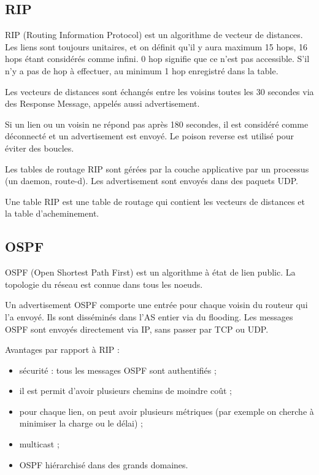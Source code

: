 	\subsection{RIP}
	
	RIP (Routing Information Protocol) est un algorithme de vecteur de distances. Les liens sont toujours unitaires, et on définit qu'il y aura maximum 15 hops, 16 hops étant considérés comme infini. 0 hop signifie que ce n'est pas accessible. S'il n'y a pas de hop à effectuer, au minimum 1 hop enregistré dans la table.
	
	
	Les vecteurs de distances sont échangés entre les voisins toutes les 30 secondes via des Response Message, appelés aussi advertisement.
	
	Si un lien ou un voisin ne répond pas après 180 secondes, il est considéré comme déconnecté et un advertisement est envoyé. Le poison reverse est utilisé pour éviter des boucles.
	
	Les tables de routage RIP sont gérées par la couche applicative par un processus (un daemon, route-d). Les advertisement sont envoyés dans des paquets UDP.
	
	
	Une table RIP est une table de routage qui contient les vecteurs de distances et la table d'acheminement.		
	
	
	\subsection{OSPF}
	
	OSPF (Open Shortest Path First) est un algorithme à état de lien public. La topologie du réseau est connue dans tous les noeuds.
	
	Un advertisement OSPF comporte une entrée pour chaque voisin du routeur qui l'a envoyé. Ils sont disséminés dans l'AS entier via du flooding. Les messages OSPF sont envoyés directement via IP, sans passer par TCP ou UDP.
	
	Avantages par rapport à RIP :
	
	\begin{itemize}
		\item sécurité : tous les messages OSPF sont authentifiés ;
		\item il est permit d'avoir plusieurs chemins de moindre coût ;
		\item pour chaque lien, on peut avoir plusieurs métriques (par exemple on cherche à minimiser la charge ou le délai) ;
		\item multicast ;
		\item OSPF hiérarchisé dans des grands domaines.
	\end{itemize}
	
